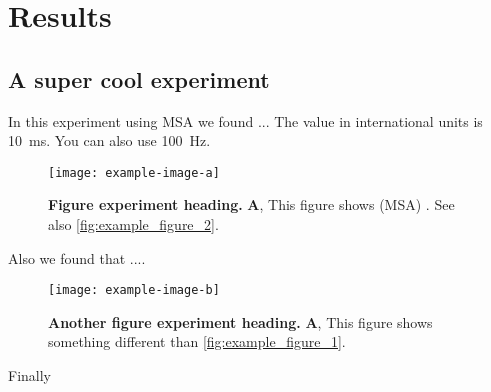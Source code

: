 \section*{Results}
\label{sec:results}

\subsection*{A super cool experiment}
\label{subsec:a_super_cool_experiment}

In this experiment using \ac{MSA} we found ... 
The value in international units is \SI{10}{\ms}. 
You can also use \SI{100}{\Hz}. 


\begin{figure}
	\centering
	\texttt{[image: example-image-a]}
	\caption{
	\textbf{\color{Black}Figure experiment heading.}
	\textbf{A}, This figure shows (\acs{MSA}) \citep{undurragaNeuralRepresentationInteraural2016}.
	See also \autoref{fig:example_figure_2}.
	}
	\label{fig:example_figure_1}
\end{figure}

Also we found that ....

\lipsum[1-4]

\begin{figure}
	\centering
	\texttt{[image: example-image-b]}
	\caption{
	\textbf{\color{Black}Another figure experiment heading.}
	\textbf{A}, This figure shows something different than \autoref{fig:example_figure_1}.
	}
	\label{fig:example_figure_2}
\end{figure}

Finally 

\lipsum[1-4]

